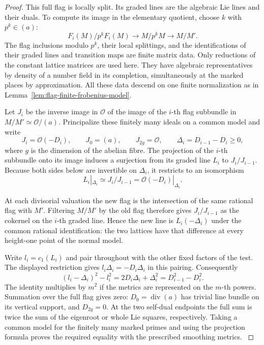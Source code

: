 \begin{proof}
This full flag is locally split. Its graded lines are the algebraic
Lie lines and their duals. To compute its image in the elementary
quotient, choose \(k\) with \(p^k\in(a)\):
\[
       F_i(M)/p^k F_i(M)\longrightarrow M/p^kM
                              \longrightarrow M/M'.
\]
The flag inclusions modulo \(p^k\), their local splittings, and the
identifications of their graded lines and transition maps are finite
matrix data. Only reductions of the constant lattice matrices are used here.
They have algebraic representatives by density of a number field in
its completion, simultaneously at the marked places by approximation.
All these data descend on one finite normalization as in
Lemma~\ref{lem:flag-finite-frobenius-model}.

Let \(J_i\) be the inverse image in \(\mathcal O\) of the image of
the \(i\)-th flag subbundle in \(M/M'\simeq\mathcal O/(a)\).
Principalize these finitely many ideals on a common model and write
\[
    J_i=\mathcal O(-D_i),\qquad J_0=(a),\qquad J_{2g}=\mathcal O,
          \qquad \Delta_i=D_{i-1}-D_i\ge0,
\]
where \(g\) is the dimension of the abelian fibre. The projection of
the \(i\)-th subbundle onto its image induces a surjection from its
graded line \(L_i\) to \(J_i/J_{i-1}\). Because both sides below are
invertible on \(\Delta_i\), it restricts to an isomorphism
\[
                  L_i|_{\Delta_i}\simeq
      J_i/J_{i-1}=\mathcal O(-D_i)|_{\Delta_i}.
\]

At each divisorial valuation the new flag is the intersection of the
same rational flag with \(M'\). Filtering \(M/M'\) by the old flag
therefore gives \(J_i/J_{i-1}\) as the cokernel on the \(i\)-th
graded line. Hence the new line is \(L_i(-\Delta_i)\) under the common
rational identification: the two lattices have that difference at
every height-one point of the normal model.

Write \(l_i=c_1(L_i)\) and pair throughout with the other fixed
factors of the test. The displayed restriction gives
\(l_i\Delta_i=-D_i\Delta_i\) in this pairing. Consequently
\[
 (l_i-\Delta_i)^2-l_i^2
     =2D_i\Delta_i+\Delta_i^2=D_{i-1}^2-D_i^2 .
\]
The identity multiplies by \(m^2\) if the metrics are represented on
the \(m\)-th powers. Summation over the full flag gives zero:
\(D_0=\operatorname{div}(a)\) has trivial line bundle on its
vertical support, and \(D_{2g}=0\). At the two self-dual endpoints
the full sum is twice the sum of the eigenroot or whole Lie squares,
respectively. Taking a common model for the finitely many marked
primes and using the projection formula proves the required equality
with the prescribed smoothing metrics.
\label{cor:covolume-flag-test-14}


\end{proof}
